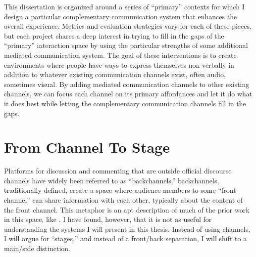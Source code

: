 This dissertation is organized around a series of ``primary'' contexts for which I design a particular complementary communication system that enhances the overall experience. Metrics and evaluation strategies vary for each of these pieces, but each project shares a deep interest in trying to fill in the gaps of the ``primary'' interaction space by using the particular strengths of some additional mediated communication system. The goal of these interventions is to create environments where people have ways to express themselves non-verbally in addition to whatever existing communication channels exist, often audio, sometimes visual. By adding mediated communication channels to other existing channels, we can focus each channel on its primary affordances and let it do what it does best while letting the complementary communication channels fill in the gaps.


\section{From Channel To Stage}

Platforms for discussion and commenting that are outside official discourse channels have widely been referred to as ``backchannels.''  backchannels, traditionally defined, create a space where audience members to some ``front channel'' can share information with each other, typically about the content of the front channel.  This metaphor is an apt description of much of the prior work in this space, like \citep{Cogdill:2001fp,Yardi:2006uk,mccarthy_digital_2004,Rekimoto:1998jy}. I have found, however, that it is not as useful for understanding the systems I will present in this thesis. Instead of using channels, I will argue for ``stages,'' and instead of a front/back separation, I will shift to a main/side distinction. 


